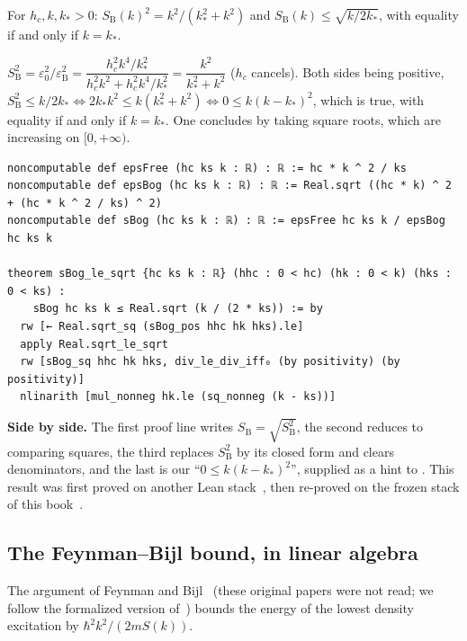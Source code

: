 \begin{proposition}\label{ch3:prop:enveloppe}
For $h_c,k,k_*>0$: $S_{\mathrm B}(k)^2=k^2/(k_*^2+k^2)$ and $S_{\mathrm B}(k)\le\sqrt{k/2k_*}$, with equality if and
only if $k=k_*$. \tierAs
\end{proposition}
\begin{humanproof}
$S_{\mathrm B}^2=\varepsilon_0^2/\varepsilon_{\mathrm B}^2=\dfrac{h_c^2k^4/k_*^2}{h_c^2k^2+h_c^2k^4/k_*^2}=\dfrac{k^2}{k_*^2+k^2}$
($h_c$ cancels). Both sides being positive,
$S_{\mathrm B}^2\le k/2k_*\iff2k_*k^2\le k(k_*^2+k^2)\iff0\le k(k-k_*)^2$, which is true, with equality if and only
if $k=k_*$. One concludes by taking square roots, which are increasing on $[0,+\infty)$.
\end{humanproof}
\begin{leanbox}
\begin{lstlisting}[style=chIIIlean]
noncomputable def epsFree (hc ks k : ℝ) : ℝ := hc * k ^ 2 / ks
noncomputable def epsBog (hc ks k : ℝ) : ℝ := Real.sqrt ((hc * k) ^ 2 + (hc * k ^ 2 / ks) ^ 2)
noncomputable def sBog (hc ks k : ℝ) : ℝ := epsFree hc ks k / epsBog hc ks k

theorem sBog_le_sqrt {hc ks k : ℝ} (hhc : 0 < hc) (hk : 0 < k) (hks : 0 < ks) :
    sBog hc ks k ≤ Real.sqrt (k / (2 * ks)) := by
  rw [← Real.sqrt_sq (sBog_pos hhc hk hks).le]
  apply Real.sqrt_le_sqrt
  rw [sBog_sq hhc hk hks, div_le_div_iff₀ (by positivity) (by positivity)]
  nlinarith [mul_nonneg hk.le (sq_nonneg (k - ks))]
\end{lstlisting}
\end{leanbox}
\noindent \textbf{Side by side.} The first proof line writes $S_{\mathrm B}=\sqrt{S_{\mathrm B}^2}$, the second
reduces to comparing squares, the third replaces $S_{\mathrm B}^2$ by its closed form and clears denominators, and
the last is our ``$0\le k(k-k_*)^2$'', supplied as a hint to . This result was first proved
on another Lean stack~\cite{ch3-bsk}, then re-proved on the frozen stack of this book~\cite{ch3-fb}.

\subsection{The Feynman--Bijl bound, in linear algebra}\label{ch3:sec:fb}
The argument of Feynman and Bijl~\cite{ch3-feynman} (these original papers were not read; we follow the formalized
version of~\cite{ch3-fb}) bounds the energy of the lowest density excitation by $\hbar^2k^2/(2mS(k))$.
